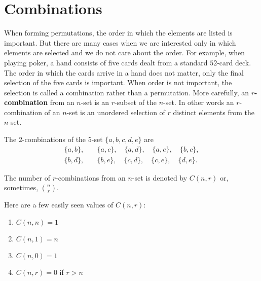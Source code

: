 \section{Combinations}
When forming permutations, the order in which the elements are listed is
important. But there are many cases when we are interested only in 
which elements are selected and we do not care about the order. For example,
when playing poker, a hand consists of five cards dealt from a standard
$52$-card deck. The order  in which the cards arrive in a hand does not
matter, only the final selection of the five cards is important. When order
is not important, the selection is called a combination rather than a permutation.
More carefully, an {\bfseries $r$-combination} from an $n$-set is an 
$r$-subset of the $n$-set. In other words an $r$-combination of an $n$-set is 
an unordered selection of  $r$ distinct elements from the $n$-set. 


\begin{exmp}\label{exmp:C(5,2)}
 The $2$-combinations of the $5$-set $\{a,b,c,d,e\}$ are
 \begin{align*}
   \{a,b\},\quad  &\{a,c\},\quad \{a,d\},\quad \{a,e\},\quad \{b,c\}, \\
   \{b,d\},\quad  &\{b,e\},\quad \{c,d\},\quad \{c,e\},\quad \{d,e\}.
 \end{align*}

\end{exmp}

\begin{notation}
 The number of $r$-combinations from an $n$-set is denoted
  by $C(n,r)$ or, sometimes, $\displaystyle{{n\choose r}}$.
\end{notation}

\begin{exmp}
 Here are a few easily seen values of $C(n,r)$:
 \begin{enumerate}
  \item $C(n,n) = 1$
   
  \item $C(n,1) = n$
   
  \item $C(n,0) = 1$
   
  \item $C(n,r) = 0$ if $r>n$
 \end{enumerate}
 
\end{exmp}


